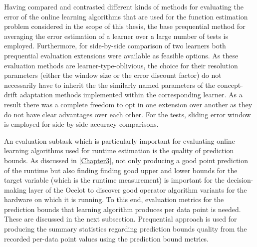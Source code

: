 Having compared and contrasted different kinds of methods for evaluating the error of the online learning algorithms that are used for the function estimation problem considered in the scope of this thesis, the base prequential method for averaging the error estimation of a learner over a large number of tests is employed. Furthermore, for side-by-side comparison of two learners both prequential evaluation extensions were available as feasible options. As these evaluation methods are learner-type-oblivious, the choice for their resolution parameters (either the window size or the error discount factor) do not necessarily have to inherit the the similarly named parameters of the concept-drift adaptation methods implemented within the corresponding learner. As a result there was a complete freedom to opt in one extension over another as they do not have clear advantages over each other. For the tests, sliding error window is employed for side-by-side accuracy comparisons.

An evaluation subtask which is particularly important for evaluating online learning algorithms used for runtime estimation is the quality of prediction bounds. As discussed in \ref{Chapter3}, not only producing a good point prediction of the runtime but also finding finding good upper and lower bounds for the target variable (which is the runtime measurement) is important for the decision-making layer of the Ocelot to discover good operator algorithm variants for the hardware on which it is running. To this end, evaluation metrics for the prediction bounds that learning algorithm produces per data point is needed. These are discussed in the next subsection. Prequential approach is used for producing the summary statistics regarding prediction bounds quality from the recorded per-data point values using the prediction bound metrics.

